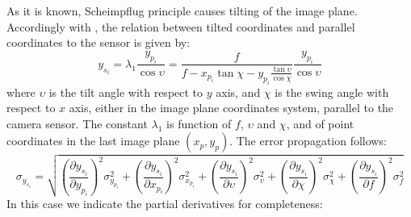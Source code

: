 As it is known, Scheimpflug principle causes tilting of the image plane. Accordingly with \cite{SchCameraCalib}, the relation between tilted coordinates and parallel coordinates to the sensor is given by:
  \begin{equation}
    \label{app:eq:sch_y}
    y_{s_i} = \lambda_1 \frac{y_{p_i}}{\cos\upsilon} =
    \frac{f}{f - x_{p_i}\tan\chi - y_{p_i}\frac{\tan\upsilon}{\cos\chi}} \frac{y_{p_i}}{ \cos\upsilon}
  \end{equation}
where $\upsilon$ is the tilt angle with respect to $y$ axis, and $\chi$ is the swing angle with respect to $x$ axis, either in the image plane coordinates system, parallel to the camera sensor. The constant $\lambda_1$ is function of $f$, $\upsilon$ and $\chi$, and of point coordinates in the last image plane $\left( x_p, y_p \right)$. The error propagation follows:
  \begin{equation*}
    \sigma_{y_{s_i}} = \sqrt{
      \left( \frac{\partial y_{s_i}}{\partial y_{p_i}} \right)^2 \sigma_{y_{p_i}}^2 +
      \left( \frac{\partial y_{s_i}}{\partial x_{p_i}} \right)^2 \sigma_{x_{p_i}}^2 +
      \left( \frac{\partial y_{s_i}}{\partial \upsilon} \right)^2 \sigma_\upsilon^2 +
      \left( \frac{\partial y_{s_i}}{\partial \chi} \right)^2 \sigma_\chi^2 +
      \left( \frac{\partial y_{s_i}}{\partial f} \right)^2 \sigma_f^2
    }
  \end{equation*}
In this case we indicate the partial derivatives for completeness: \\
